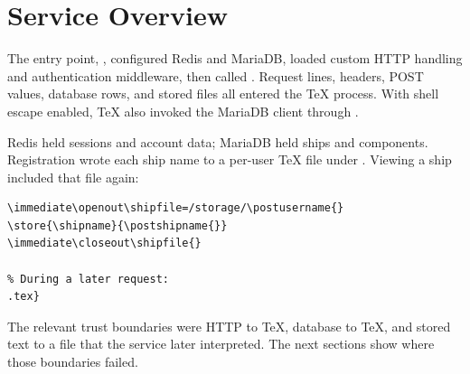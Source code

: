 \section{Service Overview}
\label{sec:service-overview}

The entry point, , configured Redis and MariaDB, loaded
custom HTTP handling and authentication middleware, then called
. Request lines, headers, POST values,
database rows, and stored files all entered the TeX process. With shell escape
enabled, TeX also invoked the MariaDB client through .

Redis held sessions and account data; MariaDB held ships and components.
Registration wrote each ship name to a per-user TeX file under
. Viewing a ship included that file again:

\begin{lstlisting}
\immediate\openout\shipfile=/storage/\postusername{}
\store{\shipname}{\postshipname{}}
\immediate\closeout\shipfile{}

% During a later request:
.tex}
\end{lstlisting}

The relevant trust boundaries were HTTP to TeX, database to TeX, and stored
text to a file that the service later interpreted. The next sections show
where those boundaries failed.
